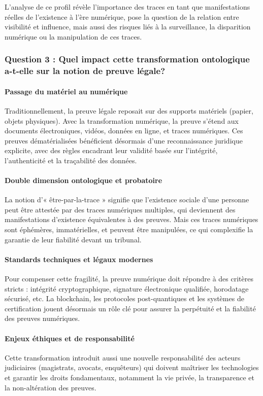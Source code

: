 \documentclass[12pt, a4paper]{article}
\begin{document}
	L'analyse de ce profil révèle l'importance des traces en tant que manifestations réelles de l'existence à l'ère numérique, pose la question de la relation entre visibilité et influence, mais aussi des risques liés à la surveillance, la disparition numérique ou la manipulation de ces traces.
	
	\subsubsection*{Question 3 : Quel impact cette transformation ontologique a-t-elle sur la notion de preuve légale?}
	
	\paragraph{Passage du matériel au numérique}
	Traditionnellement, la preuve légale reposait sur des supports matériels (papier, objets physiques). Avec la transformation numérique, la preuve s'étend aux documents électroniques, vidéos, données en ligne, et traces numériques. Ces preuves dématérialisées bénéficient désormais d'une reconnaissance juridique explicite, avec des règles encadrant leur validité basée sur l'intégrité, l'authenticité et la traçabilité des données.
	
	\paragraph{Double dimension ontologique et probatoire}
	La notion d'« être-par-la-trace » signifie que l'existence sociale d'une personne peut être attestée par des traces numériques multiples, qui deviennent des manifestations d'existence équivalentes à des preuves. Mais ces traces numériques sont éphémères, immatérielles, et peuvent être manipulées, ce qui complexifie la garantie de leur fiabilité devant un tribunal.
	
	\paragraph{Standards techniques et légaux modernes}
	Pour compenser cette fragilité, la preuve numérique doit répondre à des critères stricts : intégrité cryptographique, signature électronique qualifiée, horodatage sécurisé, etc. La blockchain, les protocoles post-quantiques et les systèmes de certification jouent désormais un rôle clé pour assurer la perpétuité et la fiabilité des preuves numériques.
	
	\paragraph{Enjeux éthiques et de responsabilité}
	Cette transformation introduit aussi une nouvelle responsabilité des acteurs judiciaires (magistrats, avocats, enquêteurs) qui doivent maîtriser les technologies et garantir les droits fondamentaux, notamment la vie privée, la transparence et la non-altération des preuves.
	
\end{document}
